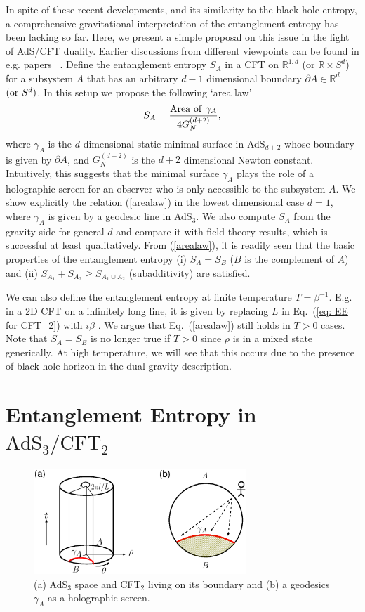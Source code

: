 \documentclass[amsmath,amssymb,nofootinbib,eqsecnum,tighten,prd,12pt]{revtex4}
\def\frac#1#2{{#1\over #2}}
\def\de{\partial}
\def\frac#1#2{{#1\over #2}}
\begin{document}
In spite of
these recent developments, and
its similarity to the black hole entropy,
a comprehensive gravitational interpretation of the entanglement
entropy has been lacking so far.  Here,  we present a simple proposal
on this issue in the light of AdS/CFT duality.
Earlier discussions from
different viewpoints can be
found in e.g.  papers \ \cite{HMS,MBH}. Define
the entanglement entropy $S_A$ in
a CFT on
$\mathbb{R}^{1,d}$ (or $\mathbb{R}\times S^{d}$)
for a subsystem $A$ that has an arbitrary $d-1$ dimensional
boundary $\de A\in \mathbb{R}^{d}$ $({\rm or}~ S^{d})$.
In this setup we propose the following `area law'
\begin{equation} S_{A}=\frac{{\rm Area~of}~\gamma_{A}}{4G^{(d+2)}_N},
\label{arealaw}
\end{equation}
where $\gamma_{A}$ is the $d$ dimensional static minimal surface in
AdS$_{d+2}$ whose boundary is given by $\de A$, and $G^{(d+2)}_{N}$
is the $d+2$ dimensional Newton constant. Intuitively, this suggests
that the minimal surface $\gamma_A$ plays the role of a holographic
screen for an observer who is only accessible to the subsystem $A$.
We show explicitly the relation (\ref{arealaw}) in the lowest
dimensional case $d=1$, where $\gamma_{A}$ is given by a geodesic
line in AdS$_3$. We also compute $S_A$ from the gravity side for
general $d$ and compare it with field theory results, which is
successful at least qualitatively. From (\ref{arealaw}), it is
readily seen that the basic properties of the entanglement entropy
(i) $S_A=S_B$ ($B$ is the complement of $A$) and (ii)
$S_{A_1}+S_{A_2}\geq S_{A_1\cup A_2}$ (subadditivity) are satisfied.

We can also define the entanglement entropy at finite temperature $T=\beta^{-1}$.
E.g. in a 2D CFT on a infinitely long line, it is given by
replacing $L$ in Eq.\ (\ref{eq: EE for CFT_2})
with $i\beta$ \cite{Calabrese04}.   We argue that Eq.\ (\ref{arealaw}) still holds
in $T> 0$ cases. Note that $S_A=S_B$ is no longer true if $T> 0$ since
$\rho$ is in a mixed state generically. At high temperature,
we will see that this occurs due to the presence of black hole horizon
in the dual gravity description.

\section{Entanglement Entropy in $\mathrm{AdS}_3/\mathrm{CFT}_2$}

\begin{figure}
\begin{center}
\includegraphics[width=8cm,clip]{holography_ads3_cft2.eps}
\end{center}
\caption{
\label{fig: ads3_cft2.eps}
(a)
AdS$_3$ space and CFT$_2$ living on its boundary
and (b) a geodesics $\gamma_A$ as a
holographic screen.
}
\end{figure}
\end{document}
